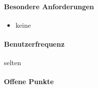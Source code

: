 \paragraph{Besondere Anforderungen}
\begin{itemize}
	\item keine
\end{itemize}

\paragraph{Benutzerfrequenz}
selten

\paragraph{Offene Punkte}

\newpage
